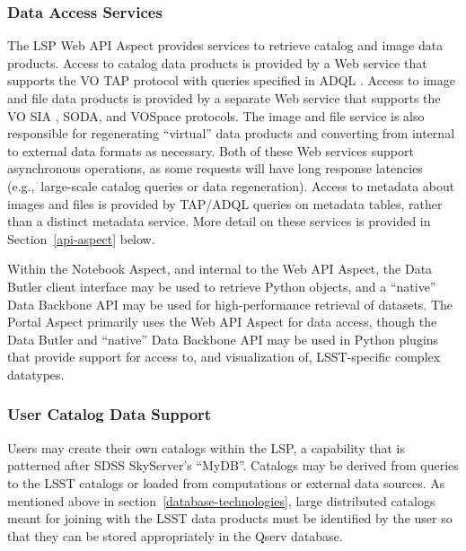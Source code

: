 \subsubsection{Data Access Services}\label{data-access-services}

The LSP Web API Aspect provides services to retrieve catalog and image data
products.  
Access to catalog data products is provided by a Web service that
supports the VO TAP protocol \citep{2010ivoa.spec.0327D} with queries specified
in ADQL \citep{2008ivoa.spec.1030O}.
Access to image
and file data products is provided by a separate Web service that supports the
VO SIA \citep{2015ivoa.spec.1223D}, SODA, and VOSpace \citep{2013ivoa.spec.0329G} protocols.  
The image and file service is also
responsible for regenerating ``virtual'' data products and converting from
internal to external data formats as necessary.
Both of these Web services
support asynchronous operations, as some requests will have long response
latencies (e.g.,\  large-scale catalog queries or data regeneration).
Access to
metadata about images and files is provided by TAP/ADQL queries on metadata
tables, rather than a distinct metadata service.  More detail on these services
is provided in Section~\ref{api-aspect} below.

Within the Notebook Aspect, and internal to the Web API Aspect, the Data
Butler client interface may be used to retrieve Python objects, and a
``native'' Data Backbone API may be used for high-performance retrieval of
datasets.
The Portal Aspect primarily uses the Web API Aspect for data access, 
though the Data Butler and ``native'' Data Backbone API may be used in Python
plugins that provide support for access to, and visualization of, LSST-specific
complex datatypes.

\subsubsection{User Catalog Data Support}\label{user-catalog-data-support}

Users may create their own catalogs within the LSP, a capability that is
patterned after SDSS SkyServer's ``MyDB''.  
Catalogs may be derived from queries
to the LSST catalogs or loaded from computations or external data sources.  As
mentioned above in section~\ref{database-technologies}, large distributed
catalogs meant for joining with the LSST data products must be identified by
the user so that they can be stored appropriately in the Qserv database.

